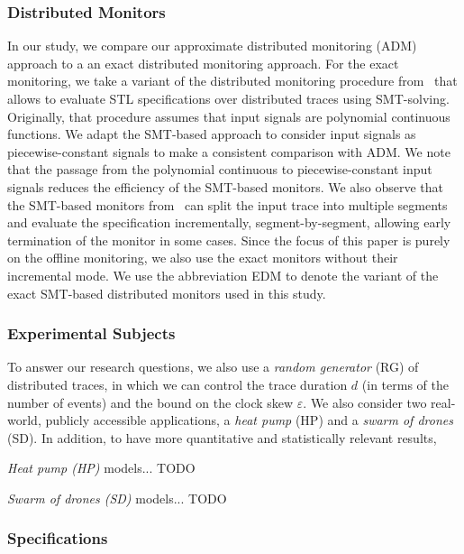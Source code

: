 \subsubsection{Distributed Monitors} \label{sec:testGeneration}
In our study, we compare our approximate distributed monitoring (ADM) approach to a an exact distributed monitoring approach. For the exact monitoring, we take a variant of the distributed monitoring procedure from~\cite{MomtazAB23} that allows to evaluate STL specifications over distributed traces using SMT-solving. Originally, that procedure assumes that input signals are polynomial continuous functions. We adapt the SMT-based approach to consider input signals as piecewise-constant signals to make a consistent comparison with ADM. We note that the passage from the polynomial continuous to piecewise-constant input signals reduces the efficiency of the SMT-based monitors. We also observe that the SMT-based monitors from~\cite{MomtazAB23} can split the input trace into multiple segments and evaluate the specification incrementally, segment-by-segment, allowing early termination of the monitor in some cases. Since the focus of this paper is purely on the offline monitoring, we also use the exact monitors without their incremental mode. We use the abbreviation EDM to denote the variant of the exact SMT-based distributed monitors used in this study.


\subsubsection{Experimental Subjects}
To answer our research questions, we also use a \emph{random generator} (RG) of distributed traces, in which we can control the trace duration $d$ (in terms of the number of events) and the bound on the clock skew $\varepsilon$.
%
We also consider two real-world, publicly accessible applications, a \emph{heat pump} (HP) and a \emph{swarm of drones} (SD). In addition, to have more quantitative and statistically relevant results,  

\noindent \emph{Heat pump (HP)} models...
\alert{TODO}

\noindent \emph{Swarm of drones (SD)} models...
\alert{TODO}

\subsubsection{Specifications}


